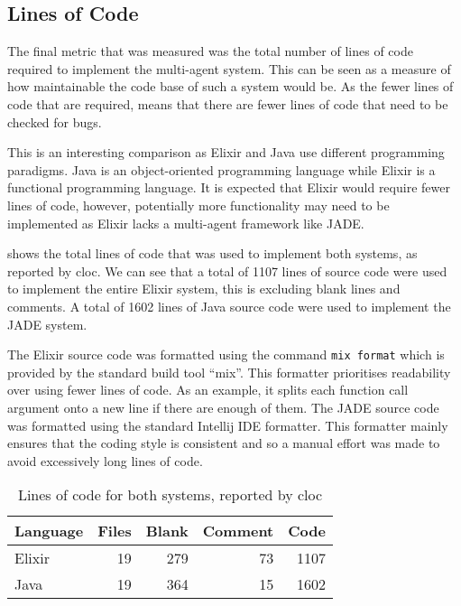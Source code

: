 \subsection{Lines of Code}

The final metric that was measured was the total number of lines of code required to implement the multi-agent system.
This can be seen as a measure of how maintainable the code base of such a system would be.
As the fewer lines of code that are required, means that there are fewer lines of code that need to be checked for bugs.

This is an interesting comparison as Elixir and Java use different programming paradigms.
Java is an object-oriented programming language while Elixir is a functional programming language.
It is expected that Elixir would require fewer lines of code, however, potentially more functionality may need to be implemented as Elixir lacks a multi-agent framework like JADE\@.

 shows the total lines of code that was used to implement both systems, as reported by cloc.
We can see that a total of 1107 lines of source code were used to implement the entire Elixir system, this is excluding blank lines and comments.
A total of 1602 lines of Java source code were used to implement the JADE system.

The Elixir source code was formatted using the command \verb|mix format| which is provided by the standard build tool ``mix''.
This formatter prioritises readability over using fewer lines of code.
As an example, it splits each function call argument onto a new line if there are enough of them.
The JADE source code was formatted using the standard Intellij IDE formatter.
This formatter mainly ensures that the coding style is consistent and so a manual effort was made to avoid excessively long lines of code.

\begin{table}[h]
    \centering
    \begin{tabular}{lrrrr}
        \toprule
        Language & Files & Blank & Comment & Code\\
        \midrule
        Elixir & 19 & 279 & 73 & 1107\\
        Java & 19 & 364 & 15 & 1602\\
        \bottomrule
    \end{tabular}
    \caption{Lines of code for both systems, reported by cloc}\label{tab:loc}
\end{table}


